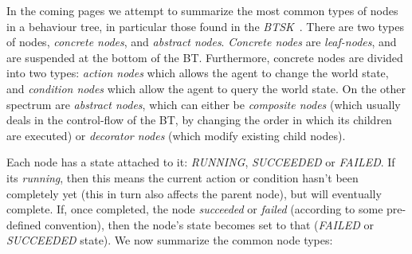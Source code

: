 \documentclass[a4paper, twocolumn]{article}
\begin{document}
        In the coming pages we attempt to summarize the most common types of nodes in a behaviour tree, in particular those found in the \emph{BTSK}~\cite{champandard2014behaviour}. There are two types of nodes, \emph{concrete nodes}, and \emph{abstract nodes}. \emph{Concrete nodes} are \emph{leaf-nodes}, and are suspended at the bottom of the BT. Furthermore, concrete nodes are divided into two types: \emph{action nodes} which allows the agent to change the world state, and \emph{condition nodes} which allow the agent to query the world state. On the other spectrum are \emph{abstract nodes}, which can either be \emph{composite nodes} (which usually deals in the control-flow of the BT, by changing the order in which its children are executed) or \emph{decorator nodes} (which modify existing child nodes).

        Each node has a state attached to it: \emph{RUNNING}, \emph{SUCCEEDED} or \emph{FAILED}. If its \emph{running}, then this means the current action or condition hasn't been completely yet (this in turn also affects the parent node), but will eventually complete. If, once completed, the node \emph{succeeded} or \emph{failed} (according to some pre-defined convention), then the node's state becomes set to that (\emph{FAILED} or \emph{SUCCEEDED} state). We now summarize the common node types:
\end{document}
